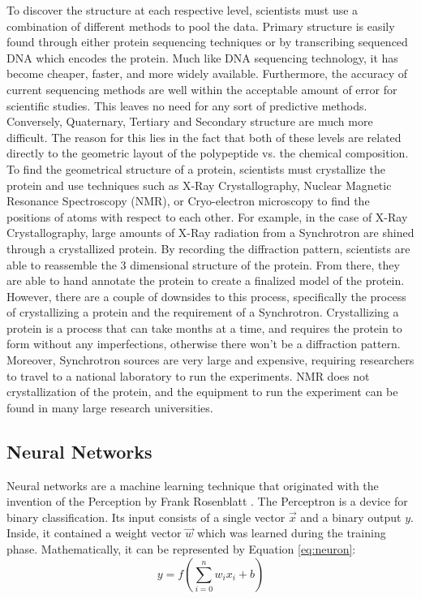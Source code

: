 \documentclass[pageno]{jpaper}
\begin{document}
\par
To discover the structure at each respective level, scientists must use a combination of different methods to pool the data.  Primary structure is easily found through either protein sequencing techniques or by transcribing sequenced DNA which encodes the protein.  Much like DNA sequencing technology, it has become cheaper, faster, and more widely available.  Furthermore, the accuracy of current sequencing methods are well within the acceptable amount of error for scientific studies.  This leaves no need for any sort of predictive methods.  Conversely, Quaternary, Tertiary and Secondary structure are much more difficult.  The reason for this lies in the fact that both of these levels are related directly to the geometric layout of the polypeptide vs. the chemical composition.  To find the geometrical structure of a protein, scientists must crystallize the protein and use techniques such as X-Ray Crystallography, Nuclear Magnetic Resonance Spectroscopy (NMR), or Cryo-electron microscopy to find the positions of atoms with respect to each other.  For example, in the case of X-Ray Crystallography, large amounts of X-Ray radiation from a Synchrotron are shined through a crystallized protein.  By recording the diffraction pattern, scientists are able to reassemble the 3 dimensional structure of the protein.  From there, they are able to hand annotate the protein to create a finalized model of the protein.  However, there are a couple of downsides to this process, specifically the process of crystallizing a protein and the requirement of a Synchrotron.  Crystallizing a protein is a process that can take months at a time, and requires the protein to form without any imperfections, otherwise there won't be a diffraction pattern.  Moreover, Synchrotron sources are very large and expensive, requiring researchers to travel to a national laboratory to run the experiments.  NMR does not crystallization of the protein, and the equipment to run the experiment can be found in many large research universities.

\subsection{Neural Networks}
Neural networks are a machine learning technique that originated with the invention of the Perception by Frank Rosenblatt \cite{rosenblatt:1958}.  The Perceptron is a device for binary classification.  Its input consists of a single vector $\vec{x}$ and a binary output $y$.  Inside, it contained a weight vector $\vec{w}$ which was learned during the training phase.  Mathematically, it can be represented by Equation \ref{eq:neuron}:
\begin{equation}
	\label{eq:neuron}
	y = f\left(\sum_{i = 0}^{n} w_{i}x_{i} + b\right)
\end{equation}
\end{document}
